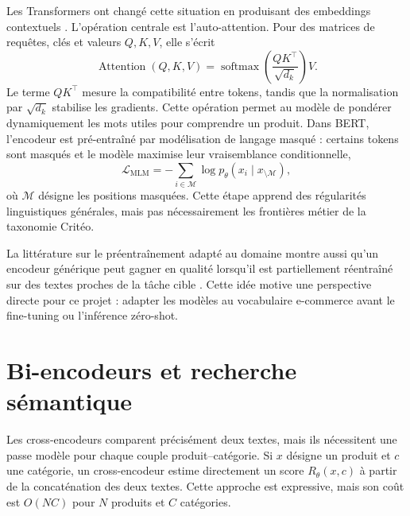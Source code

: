 \documentclass[12pt,a4paper]{report}
\begin{document}
Les Transformers ont changé cette situation en produisant des embeddings contextuels \cite{vaswani2017,devlin2019bert}. L'opération centrale est l'auto-attention. Pour des matrices de requêtes, clés et valeurs $Q,K,V$, elle s'écrit
\begin{equation}
    \operatorname{Attention}(Q,K,V)
    =
    \operatorname{softmax}\left(\frac{QK^\top}{\sqrt{d_k}}\right)V.
\end{equation}
Le terme $QK^\top$ mesure la compatibilité entre tokens, tandis que la normalisation par $\sqrt{d_k}$ stabilise les gradients. Cette opération permet au modèle de pondérer dynamiquement les mots utiles pour comprendre un produit. Dans BERT, l'encodeur est pré-entraîné par modélisation de langage masqué : certains tokens sont masqués et le modèle maximise leur vraisemblance conditionnelle,
\begin{equation}
    \mathcal{L}_{\text{MLM}}
    =
    -\sum_{i \in \mathcal{M}}
    \log p_\theta(x_i \mid x_{\setminus \mathcal{M}}),
\end{equation}
où $\mathcal{M}$ désigne les positions masquées. Cette étape apprend des régularités linguistiques générales, mais pas nécessairement les frontières métier de la taxonomie Critéo.

La littérature sur le préentraînement adapté au domaine montre aussi qu'un encodeur générique peut gagner en qualité lorsqu'il est partiellement réentraîné sur des textes proches de la tâche cible \cite{gururangan2020dont}. Cette idée motive une perspective directe pour ce projet : adapter les modèles au vocabulaire e-commerce avant le fine-tuning ou l'inférence zéro-shot.

\section{Bi-encodeurs et recherche sémantique}
\label{sec:lit-bi-encoders}

Les cross-encodeurs comparent précisément deux textes, mais ils nécessitent une passe modèle pour chaque couple produit--catégorie. Si $x$ désigne un produit et $c$ une catégorie, un cross-encodeur estime directement un score $R_\theta(x,c)$ à partir de la concaténation des deux textes. Cette approche est expressive, mais son coût est $O(NC)$ pour $N$ produits et $C$ catégories.
\end{document}
